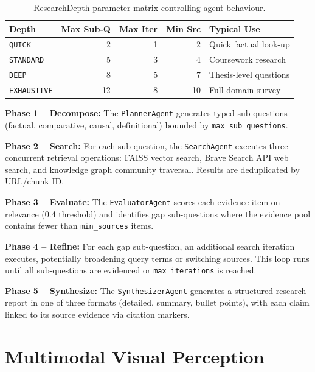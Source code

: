 \begin{table}[ht]
    \centering
    \caption{ResearchDepth parameter matrix controlling agent behaviour.}
    \label{tab:depth}
    \renewcommand{\arraystretch}{1.3}
    \begin{tabular}{lrrrl}
        \toprule
        \textbf{Depth} & \textbf{Max Sub-Q} & \textbf{Max Iter} & \textbf{Min Src} & \textbf{Typical Use} \\
        \midrule
        \texttt{QUICK}      & 2  & 1 & 2  & Quick factual look-up \\
        \texttt{STANDARD}   & 5  & 3 & 4  & Coursework research \\
        \texttt{DEEP}       & 8  & 5 & 7  & Thesis-level questions \\
        \texttt{EXHAUSTIVE} & 12 & 8 & 10 & Full domain survey \\
        \bottomrule
    \end{tabular}
\end{table}

\textbf{Phase 1 -- Decompose:} The \texttt{PlannerAgent} generates typed sub-questions (factual, comparative, causal, definitional) bounded by \texttt{max\_sub\_questions}.

\textbf{Phase 2 -- Search:} For each sub-question, the \texttt{SearchAgent} executes three concurrent retrieval operations: FAISS vector search, Brave Search API web search, and knowledge graph community traversal. Results are deduplicated by URL/chunk ID.

\textbf{Phase 3 -- Evaluate:} The \texttt{EvaluatorAgent} scores each evidence item on relevance (0.4 threshold) and identifies gap sub-questions where the evidence pool contains fewer than \texttt{min\_sources} items.

\textbf{Phase 4 -- Refine:} For each gap sub-question, an additional search iteration executes, potentially broadening query terms or switching sources. This loop runs until all sub-questions are evidenced or \texttt{max\_iterations} is reached.

\textbf{Phase 5 -- Synthesize:} The \texttt{SynthesizerAgent} generates a structured research report in one of three formats (detailed, summary, bullet points), with each claim linked to its source evidence via citation markers.

\section{Multimodal Visual Perception}
\label{sec:multimodal}

